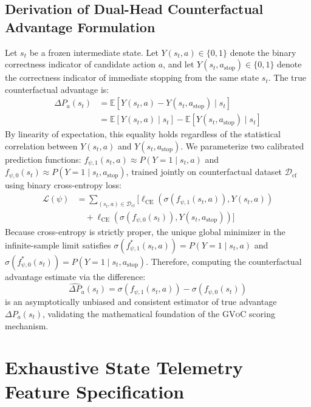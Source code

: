 \documentclass[11pt]{article}
\begin{document}
\subsection{Derivation of Dual-Head Counterfactual Advantage Formulation}
Let $s_t$ be a frozen intermediate state. Let $Y(s_t, a) \in \{0, 1\}$ denote the binary correctness indicator of candidate action $a$, and let $Y(s_t, a_{\text{stop}}) \in \{0, 1\}$ denote the correctness indicator of immediate stopping from the same state $s_t$. The true counterfactual advantage is:
\begin{equation}
\begin{split}
\Delta P_a(s_t) &= \mathbb{E}[Y(s_t, a) - Y(s_t, a_{\text{stop}}) \mid s_t] \\
&= \mathbb{E}[Y(s_t, a) \mid s_t] - \mathbb{E}[Y(s_t, a_{\text{stop}}) \mid s_t]
\end{split}
\end{equation}
By linearity of expectation, this equality holds regardless of the statistical correlation between $Y(s_t, a)$ and $Y(s_t, a_{\text{stop}})$. We parameterize two calibrated prediction functions: $f_{\psi,1}(s_t, a) \approx P(Y=1 \mid s_t, a)$ and $f_{\psi,0}(s_t) \approx P(Y=1 \mid s_t, a_{\text{stop}})$, trained jointly on counterfactual dataset $\mathcal{D}_{\text{cf}}$ using binary cross-entropy loss:
\begin{equation}
\begin{split}
\mathcal{L}(\psi) &= \sum_{(s_t, a) \in \mathcal{D}_{\text{cf}}} \Big[ \ell_{\text{CE}}(\sigma(f_{\psi,1}(s_t, a)), Y(s_t, a)) \\
&\quad + \ell_{\text{CE}}(\sigma(f_{\psi,0}(s_t)), Y(s_t, a_{\text{stop}})) \Big]
\end{split}
\end{equation}
Because cross-entropy is strictly proper, the unique global minimizer in the infinite-sample limit satisfies $\sigma(f^*_{\psi,1}(s_t, a)) = P(Y=1 \mid s_t, a)$ and $\sigma(f^*_{\psi,0}(s_t)) = P(Y=1 \mid s_t, a_{\text{stop}})$. Therefore, computing the counterfactual advantage estimate via the difference:
\begin{equation}
\hat{\Delta P}_a(s_t) = \sigma(f_{\psi,1}(s_t, a)) - \sigma(f_{\psi,0}(s_t))
\end{equation}
is an asymptotically unbiased and consistent estimator of true advantage $\Delta P_a(s_t)$, validating the mathematical foundation of the \textsc{GVoC} scoring mechanism.


\section{Exhaustive State Telemetry Feature Specification}
\label{app:telemetry}
\end{document}
